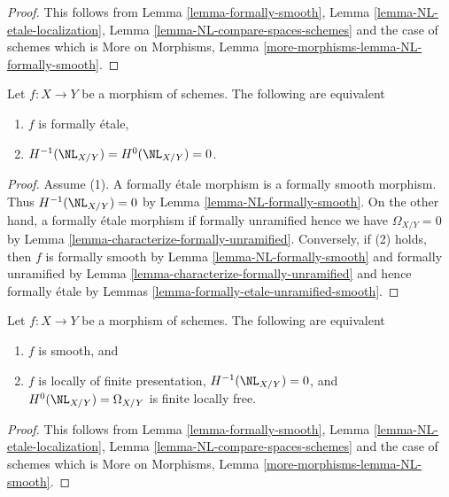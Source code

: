 \begin{proof}
This follows from
Lemma \ref{lemma-formally-smooth},
Lemma \ref{lemma-NL-etale-localization},
Lemma \ref{lemma-NL-compare-spaces-schemes}
and the case of schemes which is
More on Morphisms, Lemma \ref{more-morphisms-lemma-NL-formally-smooth}.
\end{proof}

\begin{lemma}
\label{lemma-NL-formally-etale}
Let $f : X \to Y$ be a morphism of schemes. The following are equivalent
\begin{enumerate}
\item $f$ is formally \'etale,
\item $H^{-1}(\NL_{X/Y}) = H^0(\NL_{X/Y}) = 0$.
\end{enumerate}
\end{lemma}

\begin{proof}
Assume (1). A formally \'etale morphism is a formally smooth morphism.
Thus $H^{-1}(\NL_{X/Y}) = 0$ by Lemma \ref{lemma-NL-formally-smooth}.
On the other hand, a formally \'etale morphism if formally unramified
hence we have $\Omega_{X/Y} = 0$ by
Lemma \ref{lemma-characterize-formally-unramified}.
Conversely, if (2) holds, then $f$ is formally smooth by
Lemma \ref{lemma-NL-formally-smooth}
and formally unramified by
Lemma \ref{lemma-characterize-formally-unramified}
and hence formally \'etale by
Lemmas \ref{lemma-formally-etale-unramified-smooth}.
\end{proof}

\begin{lemma}
\label{lemma-NL-smooth}
Let $f : X \to Y$ be a morphism of schemes. The following are equivalent
\begin{enumerate}
\item $f$ is smooth, and
\item $f$ is locally of finite presentation,
$H^{-1}(\NL_{X/Y}) = 0$, and $H^0(\NL_{X/Y}) = \Omega_{X/Y}$
is finite locally free.
\end{enumerate}
\end{lemma}

\begin{proof}
This follows from
Lemma \ref{lemma-formally-smooth},
Lemma \ref{lemma-NL-etale-localization},
Lemma \ref{lemma-NL-compare-spaces-schemes}
and the case of schemes which is
More on Morphisms, Lemma \ref{more-morphisms-lemma-NL-smooth}.
\end{proof}











